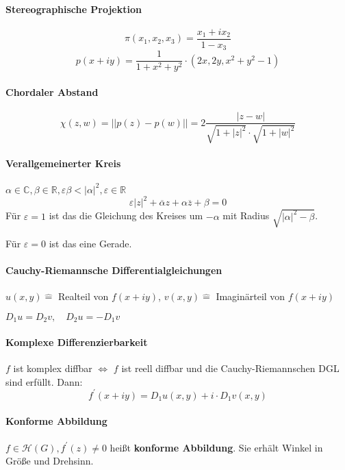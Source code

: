 \documentclass[a4paper, 10pt, DIV20, headings=small]{scrartcl}
\theoremstyle{definition}
\theoremstyle{plain}
\begin{document}
\paragraph{Stereographische Projektion}
$$\pi(x_1,x_2,x_3) = \frac{x_1 + i x_2}{1 - x_3}$$
$$p(x+iy) = \frac{1}{1+x^2+y^2}\cdot (2x, 2y, x^2+y^2-1)$$

\paragraph{Chordaler Abstand}
$$\chi (z,w) = ||p(z)-p(w)|| = 2 \frac{|z-w|}{\sqrt{1+|z|^2} \cdot \sqrt{1+|w|^2}}$$

\paragraph{Verallgemeinerter Kreis}
$\alpha \in \mathbb{C}, \beta \in \mathbb{R}, \varepsilon \beta < |\alpha|^2, \varepsilon \in \mathbb{R}$
$$\varepsilon |z|^2 + \overline{\alpha}z + \alpha \overline{z} + \beta = 0$$
Für $\varepsilon = 1$ ist das die Gleichung des Kreises um $- \alpha$ mit Radius $\sqrt{|\alpha|^2-\beta}$.

Für $\varepsilon = 0$ ist das eine Gerade.

\paragraph{Cauchy-Riemannsche Differentialgleichungen}
$u(x,y) \hat{=}$ Realteil von $f(x+iy)$, 
$v(x,y) \hat{=}$ Imaginärteil von $f(x+iy)$

$D_1u = D_2v,\quad D_2u = -D_1v$

\paragraph{Komplexe Differenzierbarkeit}
$f$ ist komplex diffbar $\Leftrightarrow$ $f$ ist reell diffbar und die Cauchy-Riemannschen DGL sind erfüllt. Dann:
$$f^\prime(x + iy) = D_1 u(x, y) + i \cdot D_1 v(x, y)$$

\paragraph{Konforme Abbildung}
$f \in \mathcal{H}(G), f^\prime(z) \neq 0$ heißt \textbf{konforme Abbildung}. Sie erhält Winkel in Größe und Drehsinn.
\end{document}

